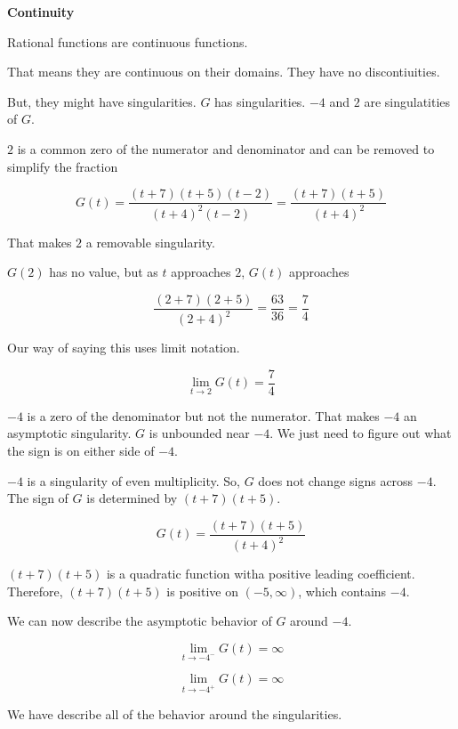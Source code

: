 \documentclass{ximera}
\begin{document}
\textbf{Continuity}

\begin{explanation}

Rational functions are continuous functions.

That means they are continuous on their domains. They have no discontiuities.

But, they might have singularities.  $G$ has singularities. $-4$ and $2$ are singulatities of $G$.


$2$ is a common zero of the numerator and denominator and can be removed to simplify the fraction


\[
G(t) = \frac{(t+7)(t+5)(t-2)}{(t+4)^2(t-2)} = \frac{(t+7)(t+5)}{(t+4)^2}
\]

That makes $2$ a removable singularity.


$G(2)$ has no value, but as $t$ approaches $2$, $G(t)$ approaches 


\[
\frac{(2+7)(2+5)}{(2+4)^2} = \frac{63}{36} = \frac{7}{4}
\]



Our way of saying this uses limit notation.



\[
\lim\limits_{t \to 2} G(t) = \frac{7}{4}
\]




$-4$ is a zero of the denominator but not the numerator.  That makes $-4$ an asymptotic singularity.  $G$ is unbounded near $-4$.  We just need to figure out what the sign is on either side of $-4$.


$-4$ is a singularity of even multiplicity.  So, $G$ does not change signs across $-4$.  The sign of $G$ is determined by $(t+7)(t+5)$.

\[
G(t) = \frac{(t+7)(t+5)}{(t+4)^2}
\]


$(t+7)(t+5)$ is a quadratic function witha positive leading coefficient. Therefore, $(t+7)(t+5)$ is positive on $(-5, \infty)$, which contains $-4$.

We can now describe the asymptotic behavior of $G$ around $-4$.


\[
\lim\limits_{t \to -4^-} G(t) = \infty
\]


\[
\lim\limits_{t \to -4^+} G(t) = \infty
\]

\end{explanation}



We have describe all of the behavior around the singularities. \\
\end{document}
